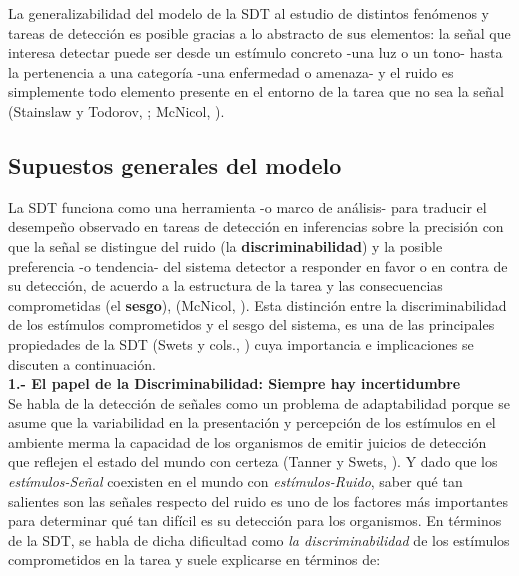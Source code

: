 La generalizabilidad del modelo de la SDT al estudio de distintos fenómenos y tareas de detección es posible gracias a lo abstracto de sus elementos: la señal que interesa detectar puede ser desde un estímulo concreto -una luz o un tono- hasta la pertenencia a una categoría -una enfermedad o amenaza- y el ruido es simplemente todo elemento presente en el entorno de la tarea que no sea la señal (Stainslaw y Todorov, \citeyear{Stainslaw1999}; McNicol, \citeyear{McNicol1}).\\ 


\subsection{Supuestos generales del modelo}

La SDT funciona como una herramienta -o marco de análisis- para traducir el desempeño observado en tareas de detección en inferencias sobre la precisión con que la señal se distingue del ruido (la \textbf{discriminabilidad}) y la posible preferencia -o tendencia- del sistema detector a responder en favor o en contra de su detección, de acuerdo a la estructura de la tarea y las consecuencias comprometidas (el \textbf{sesgo}), (McNicol, \citeyear{McNicol1}). Esta distinción entre la discriminabilidad de los estímulos comprometidos y el sesgo del sistema, es una de las principales propiedades de la SDT (Swets y cols., \citeyear{Swets1961}) cuya importancia e implicaciones se discuten a continuación.\\

\textbf{1.- El papel de la Discriminabilidad: Siempre hay incertidumbre}\\

Se habla de la detección de señales como un problema de adaptabilidad porque se asume que la variabilidad en la presentación y percepción de los estímulos en el ambiente merma la capacidad de los organismos de emitir juicios de detección que reflejen el estado del mundo con certeza (Tanner y Swets, \citeyear{Tanner1954}). Y dado que los \textit{estímulos-Señal} coexisten en el mundo con \textit{estímulos-Ruido}, saber qué tan salientes son las señales respecto del ruido es uno de los factores más importantes para determinar qué tan difícil es su detección para los organismos. En términos de la SDT, se habla de dicha dificultad como \textit{la discriminabilidad} de los estímulos comprometidos en la tarea y suele explicarse en términos de:\\

